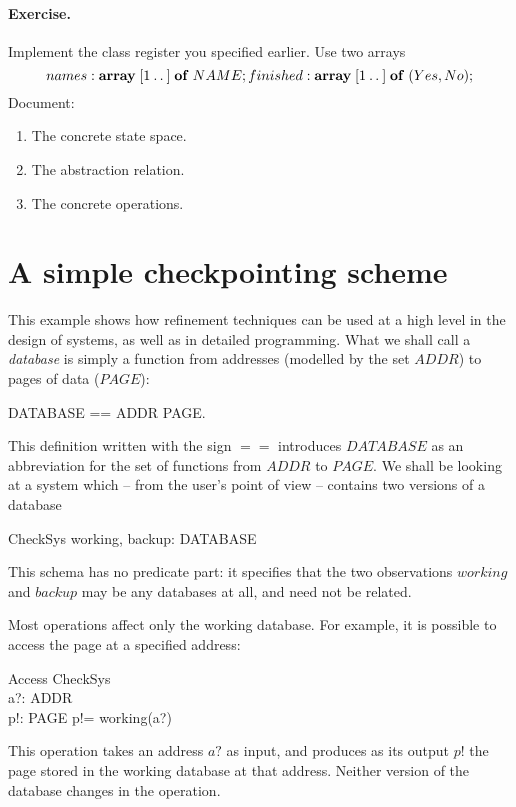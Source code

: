 \documentclass[12pt]{article}
\newcommand{\Array}{\mathrel{\bf array}}
\newcommand{\Of}{\mathrel{\bf of}}
\begin{document}
\paragraph{Exercise.}
Implement the class register you specified earlier. Use two arrays
\[
	names:\;\Array [1\upto{}] \Of NAME; \\
	finished:\;\Array [1\upto{}] \Of (Yes, No);
\]
Document:
\begin{enumerate}
\item	The concrete state space.
\item	The abstraction relation.
\item	The concrete operations.
\end{enumerate}

\section{A simple checkpointing scheme}

This example shows how refinement techniques can be used at
a high level in the design of systems, as well as in
detailed programming. 
What we shall call a {\em database\/} is simply a function from
addresses (modelled by the set $ADDR$) to pages of data ($PAGE$):
\begin{zed}
	DATABASE == ADDR \fun PAGE.
\end{zed}
This definition written with the sign $==$ introduces $DATABASE$ as an
abbreviation for the set of functions from $ADDR$ to $PAGE$.  We shall
be looking at a system which -- from the user's point of view --
contains two versions of a database
\begin{schema}{CheckSys}
	working, backup: DATABASE
\end{schema}
This schema has no predicate part: it specifies that the two observations
$working$ and $backup$ may be any databases at all, and need not be related.

Most operations affect only the working database. For example,
it is possible to access the page at a specified address:
\begin{schema}{Access}
	\Xi CheckSys \\
	a?: ADDR \\
	p!: PAGE
\where
	p!= working(a?)
\end{schema}
This operation takes an address $a?$ as input, and produces as its output
$p!$ the page stored in the working database at that address.  Neither
version of the database changes in the operation.
\end{document}
